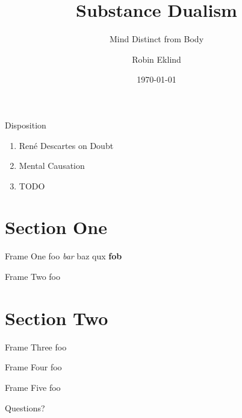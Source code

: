 \documentclass[aspectratio=1610]{beamer}
\title{Substance Dualism}
\subtitle{Mind Distinct from Body}
\date{\today}
\author{Robin Eklind}
\begin{document}

\maketitle


\begin{frame}{Disposition}
	\begin{enumerate}
		\item René Descartes on Doubt
		\item Mental Causation
		\item TODO
	\end{enumerate}
\end{frame}


\section{Section One}


\begin{frame}{Frame One}
	foo \emph{bar} baz \alert{qux} \textbf{fob}
\end{frame}


\begin{frame}{Frame Two}
	foo
\end{frame}


\section{Section Two}


\begin{frame}{Frame Three}
	foo
\end{frame}


\begin{frame}{Frame Four}
	foo
\end{frame}


\begin{frame}{Frame Five}
	foo
\end{frame}


\begin{frame}[standout]
	Questions?
\end{frame}
\end{document}
